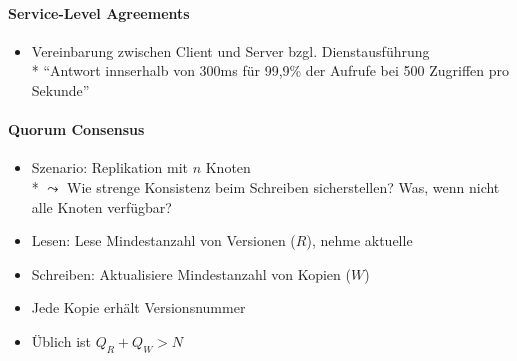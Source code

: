\paragraph{Service-Level Agreements}
\begin{itemize}
	\item Vereinbarung zwischen Client und Server bzgl. Dienstausführung
		\\*
		``Antwort innserhalb von 300ms für 99,9\% der Aufrufe bei 500 Zugriffen pro Sekunde''
\end{itemize}

\paragraph{Quorum Consensus}
\begin{itemize}
	\item Szenario: Replikation mit \( n \) Knoten
		\\*
		\( \leadsto \) Wie strenge Konsistenz beim Schreiben sicherstellen? Was, wenn nicht alle Knoten verfügbar?
	\item Lesen: Lese Mindestanzahl von Versionen (\( R \)), nehme aktuelle
	\item Schreiben: Aktualisiere Mindestanzahl von Kopien (\( W \))
	\item Jede Kopie erhält Versionsnummer
	\item Üblich ist \( Q_R+Q_W > N \)
\end{itemize}



